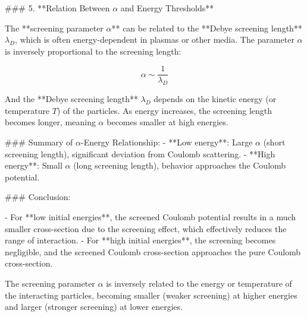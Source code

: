 ### 5. **Relation Between \( \alpha \) and Energy Thresholds**

The **screening parameter \( \alpha \)** can be related to the **Debye screening length** \( \lambda_D \), which is often energy-dependent in plasmas or other media. The parameter \( \alpha \) is inversely proportional to the screening length:

\[
\alpha \sim \frac{1}{\lambda_D}
\]

And the **Debye screening length** \( \lambda_D \) depends on the kinetic energy (or temperature \( T \)) of the particles. As energy increases, the screening length becomes longer, meaning \( \alpha \) becomes smaller at high energies.

### Summary of \( \alpha \)-Energy Relationship:
- **Low energy**: Large \( \alpha \) (short screening length), significant deviation from Coulomb scattering.
- **High energy**: Small \( \alpha \) (long screening length), behavior approaches the Coulomb potential.

### Conclusion:

- For **low initial energies**, the screened Coulomb potential results in a much smaller cross-section due to the screening effect, which effectively reduces the range of interaction.
- For **high initial energies**, the screening becomes negligible, and the screened Coulomb cross-section approaches the pure Coulomb cross-section.
  
The screening parameter \( \alpha \) is inversely related to the energy or temperature of the interacting particles, becoming smaller (weaker screening) at higher energies and larger (stronger screening) at lower energies.
